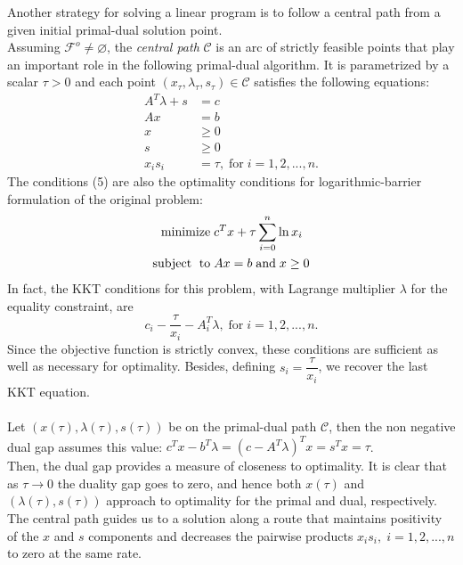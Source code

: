\documentclass[a4paper,10 pt,titlepage,twoside]{book}
\theoremstyle{plain}
\theoremstyle{definition}
\theoremstyle{remark}
\begin{document}
Another strategy for solving a linear program is to follow a central path from a given initial primal-dual solution point.\\ Assuming $\mathcal{F}^{o}\neq \varnothing$, the \textit{central path} $\mathcal{C}$ is an arc of strictly feasible points that play an important role in the following primal-dual algorithm. It is parametrized by a scalar $\tau  > 0$ and each point $(x_{\tau}, \lambda_{\tau}, s_{\tau})\in \mathcal{C}$ satisfies the following equations:
\begin{align}
A^{T}\lambda+s&=c\\
Ax&=b\\
x&\geq 0\\
s&\geq 0\\
x_{i}s_{i}&= \tau,\; \text{for}\;i= 1,2,...,n.\label{(Tao)}
\end{align} 
The conditions (5) are also the optimality conditions for  logarithmic-barrier formulation of the original problem:
\begin{equation}
\begin{split}
\text{minimize\;} &c^{T}x + \tau\sum_{i=0}^{n}\ln{x_{i}}\\
\text{subject\; to\;}&Ax = b\;\text{and\;} x\geq0
\end{split}
\end{equation}
In fact, the KKT conditions for this problem, with Lagrange multiplier $\lambda$ for the equality constraint, are
\begin{equation*}
c_{i} - \dfrac{\tau}{x_{i}} - A^{T}_{i}\lambda,\; \text{for}\;i = 1,2,...,n.
\end{equation*}  
Since the objective function is strictly convex, these conditions are sufficient as well as necessary for optimality. Besides, defining $s_{i} = \dfrac{\tau}{x_{i}}$, we recover the last KKT equation.
\\
\\
Let $(x(\tau), \lambda(\tau), s(\tau))$ be on the primal-dual path $\mathcal{C}$, then the non negative dual gap assumes this value: $c^{T}x-b^{T}\lambda=\left(c-A^{T}\lambda\right)^{T}x=s^{T}x=\tau$.\\
Then, the dual gap provides a measure of closeness to optimality. It is clear that as $\tau\to0$ the duality gap goes to zero, and hence both $x(\tau)$ and
 $(\lambda(\tau), s(\tau))$ approach to optimality for the primal and dual, respectively. The central path guides us to a solution along a route that maintains positivity of the $x$ and $s$ components and decreases the pairwise products $x_{i}s_{i},\;i = 1,2,...,n$ to zero at the same rate.\\
\end{document}
